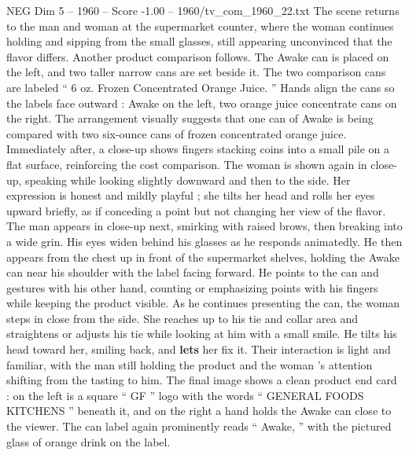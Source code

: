 \begin{textsample}{NEG Dim 5 – 1960 – Score -1.00 – 1960/tv\_com\_1960\_22.txt}
The scene returns to the man and woman at the supermarket counter, where the woman continues holding and sipping from the small glasses, still appearing unconvinced that the flavor differs.
Another product comparison follows.
The Awake can is placed on the left, and two taller narrow cans are set beside it.
The two comparison cans are labeled “ 6 oz.
Frozen Concentrated Orange Juice. ” Hands align the cans so the labels face outward : Awake on the left, two orange juice concentrate cans on the right.
The arrangement visually suggests that one can of Awake is being compared with two six-ounce cans of frozen concentrated orange juice.
Immediately after, a close-up shows fingers stacking coins into a small pile on a flat surface, reinforcing the cost comparison.
The woman is shown again in close-up, speaking while looking slightly downward and then to the side.
Her expression is honest and mildly playful ; she tilts her head and rolls her eyes upward briefly, as if conceding a point but not changing her view of the flavor.
The man appears in close-up next, smirking with raised brows, then breaking into a wide grin.
His eyes widen behind his glasses as he responds animatedly.
He then appears from the chest up in front of the supermarket shelves, holding the Awake can near his shoulder with the label facing forward.
He points to the can and gestures with his other hand, counting or emphasizing points with his fingers while keeping the product visible.
As he continues presenting the can, the woman steps in close from the side.
She reaches up to his tie and collar area and straightens or adjusts his tie while looking at him with a small smile.
He tilts his head toward her, smiling back, and \textbf{lets} her fix it.
Their interaction is light and familiar, with the man still holding the product and the woman ’s attention shifting from the tasting to him.
The final image shows a clean product end card : on the left is a square “ GF ” logo with the words “ GENERAL FOODS KITCHENS ” beneath it, and on the right a hand holds the Awake can close to the viewer.
The can label again prominently reads “ Awake, ” with the pictured glass of orange drink on the label.

\end{textsample}

